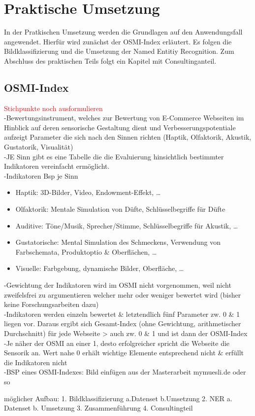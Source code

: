 \newpage
\section{Praktische Umsetzung} \label{latexDetails}

In der Pratkischen Umsetzung werden die Grundlagen auf den Anwendungsfall angewendet. Hierfür wird zunächst der \ac{OSMI}-Index erläutert.
Es folgen die Bildklassifizierung und die Umsetzung der Named Entitiy Recognition. Zum Abschluss des praktischen Teils folgt ein Kapitel
mit Consultinganteil.

\subsection{OSMI-Index}

\textcolor{red}{Stichpunkte noch ausformulieren} \\

-Bewertungsinstrument, welches zur Bewertung von E-Commerce Webseiten im Hinblick auf
deren sensorische Gestaltung dient und Verbesserungspotentiale aufzeigt
Parameter die sich nach den Sinnen richten (Haptik, Olfaktorik, Akustik, Gustatorik,
Visualität) \\
-JE Sinn gibt es eine Tabelle die die Evaluierung hinsichtlich bestimmter Indikatoren
vereinfacht ermöglicht. \\
-Indikatoren Bsp je Sinn\\
\begin{itemize}
	\item Haptik: 3D-Bilder, Video, Endowment-Effekt, …
	\item Olfaktorik: Mentale Simulation von Düfte, Schlüsselbegriffe für Düfte
	\item Auditive: Töne/Musik, Sprecher/Stimme, Schlüsselbegriffe für Akustik, …
	\item Gustatorische: Mental Simulation des Schmeckens, Verwendung von
	Farbschemata, Produktoptio \& Oberflächen, …
	\item Visuelle: Farbgebung, dynamische Bilder, Oberfläche, …
\end{itemize}

-Gewichtung der Indikatoren wird im \ac{OSMI} nicht vorgenommen, weil nicht zweifelsfrei zu
argumentieren welcher mehr oder weniger bewertet wird (bisher keine Forschungsarbeiten
dazu) \\
-Indikatoren werden einzeln bewertet \& letztendlich fünf Parameter zw. 0 \& 1 liegen vor.
Daraus ergibt sich Gesamt-Index (ohne Gewichtung, arithmetischer Durchschnitt) für jede
Webseite > auch zw. 0 \& 1 und ist dann der \ac{OSMI}-Index \\
-Je näher der \ac{OSMI} an einer 1, desto erfolgreicher spricht die Webseite die Sensorik an. Wert
nahe 0 erhält wichtige Elemente entsprechend nicht \& erfüllt die Indikatoren nicht \\
-BSP eines \ac{OSMI}-Indexes: Bild einfügen aus der Masterarbeit mymuesli.de oder so



möglicher Aufbau:
1.	Bildklassifizierung
	a.Datenset
	b.Umsetzung
2.	NER
	a.	Datenset
	b.	Umsetzung
3.	Zusammenführung
4.	Consultingteil
